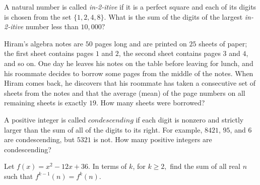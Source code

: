 \documentclass{article}
\begin{document}
\begin{prob}[CMC 10A 2021/13]{6}
A natural number is called \textit{in-2-itive} if it is a perfect square and each of its digits is chosen from the set $\{1,2,4,8\}.$ What is the sum of the digits of the largest \textit{in-2-itive} number less than $10,000?$
\end{prob}

\begin{req}[AMC 10A 2021/22]{6}
Hiram's algebra notes are $50$ pages long and are printed on $25$ sheets of paper; the first sheet contains pages $1$ and $2$, the second sheet contains pages $3$ and $4$, and so on. One day he leaves his notes on the table before leaving for lunch, and his roommate decides to borrow some pages from the middle of the notes. When Hiram comes back, he discovers that his roommate has taken a consecutive set of sheets from the notes and that the average (mean) of the page numbers on all remaining sheets is exactly $19$. How many sheets were borrowed?
\end{req}

\begin{prob}[CMC 10A 2021/19]{6}
A positive integer is called $\textit{condescending}$ if each digit is nonzero and strictly larger than the sum of all of the digits to its right. For example, $8421$, $95$, and $6$ are condescending, but $5321$ is not. How many positive integers are condescending?
\end{prob}

\begin{prob}{9}
Let $f(x)=x^2-12x+36.$ In terms of $k$, for $k\geq 2,$ find the sum of all real $n$ such that $f^{k-1}(n)=f^k(n).$
\end{prob}
\end{document}
